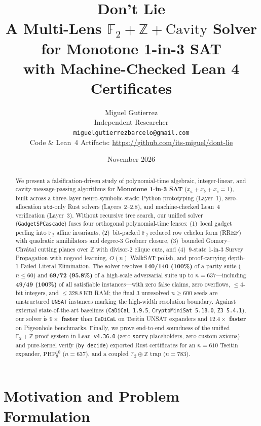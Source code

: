 \documentclass[11pt]{article}
\title{\textbf{\LARGE Don't Lie}\\[4pt]
{\large A Multi-Lens $\mathbb{F}_2 + \mathbb{Z} + \text{Cavity}$ Solver for Monotone 1-in-3 SAT\\
with Machine-Checked Lean 4 Certificates}}
\author{Miguel Gutierrez\\
\small Independent Researcher\\
\small \texttt{miguelgutierrezbarcelo@gmail.com}\\
\small Code \& Lean~4 Artifacts: \url{https://github.com/its-miguel/dont-lie}}
\date{November 2026}
\begin{document}
\maketitle

\begin{abstract}
We present a falsification-driven study of polynomial-time algebraic, integer-linear, and cavity-message-passing algorithms for \textbf{Monotone 1-in-3 SAT} ($x_a + x_b + x_c = 1$), built across a three-layer neuro-symbolic stack: Python prototyping (Layer~1), zero-allocation \texttt{std}-only Rust solvers (Layers~2--2.8), and machine-checked Lean~4 verification (Layer~3). Without recursive tree search, our unified solver (\texttt{GadgetSPCascade}) fuses four orthogonal polynomial-time lenses: (1)~local gadget peeling into $\mathbb{F}_2$ affine invariants, (2)~bit-packed $\mathbb{F}_2$ reduced row echelon form (RREF) with quadratic annihilators and degree-3 Gr\"obner closure, (3)~bounded Gomory--Chv\'atal cutting planes over $\mathbb{Z}$ with divisor-2 clique cuts, and (4)~9-state 1-in-3 Survey Propagation with nogood learning, $O(n)$ WalkSAT polish, and proof-carrying depth-1 Failed-Literal Elimination. The solver resolves \textbf{140/140 (100\%)} of a parity suite ($n \le 60$) and \textbf{69/72 (95.8\%)} of a high-scale adversarial suite up to $n = 637$---including \textbf{49/49 (100\%)} of all satisfiable instances---with zero false claims, zero overflows, $\le 4$-bit integers, and $\le 328.8\,\text{KB}$ RAM; the final 3 unresolved $n \ge 600$ seeds are unstructured \texttt{UNSAT} instances marking the high-width resolution boundary. Against external state-of-the-art baselines (\texttt{CaDiCaL~1.9.5}, \texttt{CryptoMiniSat~5.18.0}, \texttt{Z3~5.4.1}), our solver is \textbf{$9\times$ faster} than \texttt{CaDiCaL} on Tseitin UNSAT expanders and \textbf{$12.4\times$ faster} on Pigeonhole benchmarks. Finally, we prove end-to-end soundness of the unified $\mathbb{F}_2 + \mathbb{Z}$ proof system in Lean~\texttt{v4.36.0} (zero \texttt{sorry} placeholders, zero custom axioms) and pure-kernel verify (\texttt{by decide}) exported Rust certificates for an $n = 610$ Tseitin expander, $\mathrm{PHP}_9^{10}$ ($n = 637$), and a coupled $\mathbb{F}_2 \oplus \mathbb{Z}$ trap ($n = 783$).
\end{abstract}

\section{Motivation and Problem Formulation}
\end{document}
